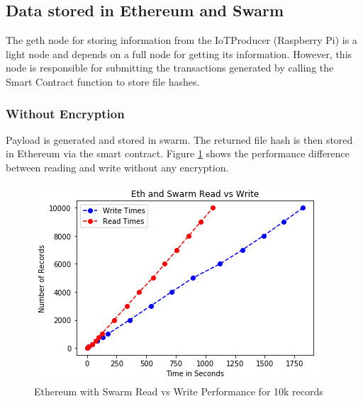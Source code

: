 \documentclass[11pt,openright]{report}
\begin{document}
\subsection{Data stored in Ethereum and Swarm}
The geth node for storing information from the IoTProducer (Raspberry Pi) is a light node and depends on a full node for getting its information. However, this node is responsible for submitting the transactions generated by calling the Smart Contract function to store file hashes.

\subsubsection{Without Encryption}
Payload is generated and stored in swarm. The returned file hash is then stored in Ethereum via the smart contract. Figure \ref{fig:graph_eth_swarm_readvwrite} shows the performance difference between reading and write without any encryption.
\newline
\newline
\begin{figure}[!htbp]
    \centering
    \includegraphics[scale=1]{results/graphs/Eth_Swarm_Read_v_Write.png}
    \caption{Ethereum with Swarm Read vs Write Performance for 10k records}
    \label{fig:graph_eth_swarm_readvwrite}
\end{figure}
\newline
\newline
\end{document}
